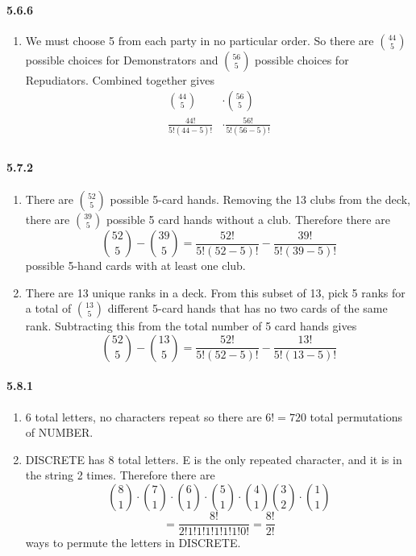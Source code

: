 \documentclass[11pt, letterpaper, twocolumn, fleqn]{article}
\begin{document}
\paragraph{5.6.6}
\begin{enumerate}
  \item We must choose 5 from each party in no particular order. So there are $\binom{44}{5}$ possible choices for Demonstrators and $\binom{56}{5}$ possible choices for Repudiators. Combined together gives 
    \begin{align*}
      \binom{44}{5} &\cdot \binom{56}{5} \\
      \frac{44!}{5!(44-5)!} &\cdot \frac{56!}{5!(56-5)!} \\
    \end{align*}
\end{enumerate}

\paragraph{5.7.2}
\begin{enumerate}
  \item There are $\binom{52}{5}$ possible 5-card hands. Removing the 13 clubs from the deck, there are $\binom{39}{5}$ possible 5 card hands without a club. Therefore there are 
    $$\binom{52}{5} - \binom{39}{5} = \frac{52!}{5!(52-5)!} - \frac{39!}{5!(39-5)!}$$
  possible 5-hand cards with at least one club.
  \item There are 13 unique ranks in a deck. From this subset of 13, pick 5 ranks for a total of $\binom{13}{5}$ different 5-card hands that has no two cards of the same rank. Subtracting this from the total number of 5 card hands gives
    $$\binom{52}{5} - \binom{13}{5} = \frac{52!}{5!(52-5)!} - \frac{13!}{5!(13-5)!}$$
\end{enumerate}

\paragraph{5.8.1}
\begin{enumerate}
  \item 6 total letters, no characters repeat so there are $6! = 720$ total permutations of NUMBER.
  \item DISCRETE has 8 total letters. E is the only repeated character, and it is in the string 2 times. Therefore there are 
    $$\binom{8}{1}\cdot\binom{7}{1}\cdot\binom{6}{1}\cdot\binom{5}{1}\cdot\binom{4}{1}\binom{3}{2}\cdot\binom{1}{1} $$
    $$= \frac{8!}{2!1!1!1!1!1!1!0!} = \frac{8!}{2!}$$
  ways to permute the letters in DISCRETE.
\end{enumerate}
\end{document}
